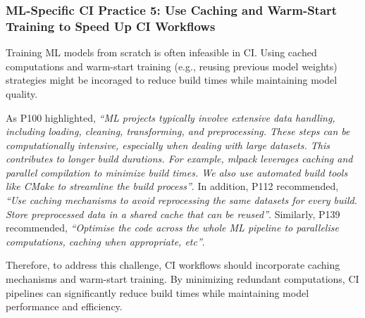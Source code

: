 \subsubsection*{\textbf{ML-Specific CI Practice 5:} Use Caching and Warm-Start Training to Speed Up CI Workflows} %

Training ML models from scratch is often infeasible in CI. Using cached computations and warm-start training (e.g., reusing previous model weights) strategies might be incoraged to reduce build times while maintaining model quality.

As P100 highlighted, \textit{``ML projects typically involve extensive data handling, including loading, cleaning, transforming, and preprocessing. These steps can be computationally intensive, especially when dealing with large datasets. This contributes to longer build durations. For example, mlpack leverages caching and parallel compilation to minimize build times. We also use automated build tools like CMake to streamline the build process''}.
In addition, P112 recommended, \textit{``Use caching mechanisms to avoid reprocessing the same datasets for every build. Store preprocessed data in a shared cache that can be reused''}. Similarly, P139 recommended, \textit{``Optimise the code across the whole ML pipeline to parallelise computations, caching when appropriate, etc''}.


Therefore, to address this challenge, CI workflows should incorporate caching mechanisms and warm-start training. By minimizing redundant computations, CI pipelines can significantly reduce build times while maintaining model performance and efficiency.







